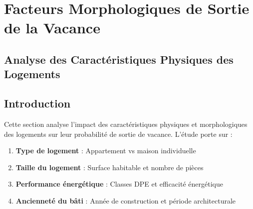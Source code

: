\documentclass[11pt]{article}
\makeatletter
\providecommand{\tightlist}{%
      \setlength{\itemsep}{0pt}\setlength{\parskip}{0pt}}
\newcommand{\boxspacing}{\kern\kvtcb@left@rule\kern\kvtcb@boxsep}
\newcommand{\prompt}[4]{
        {\ttfamily\llap{{\color{#2}[#3]:\hspace{3pt}#4}}\vspace{-\baselineskip}}
    }
\makeatother
\begin{document}
    \begin{tcolorbox}[breakable, size=fbox, boxrule=1pt, pad at break*=1mm,colback=cellbackground, colframe=cellborder]
\prompt{In}{incolor}{ }{\boxspacing}
\begin{Verbatim}[commandchars=\\\{\}]

\end{Verbatim}
\end{tcolorbox}

    \section{Facteurs Morphologiques de Sortie de la
Vacance}\label{facteurs-morphologiques-de-sortie-de-la-vacance}

\subsection{Analyse des Caractéristiques Physiques des
Logements}\label{analyse-des-caractuxe9ristiques-physiques-des-logements}

\subsection{Introduction}\label{introduction}

Cette section analyse l'impact des caractéristiques physiques et
morphologiques des logements sur leur probabilité de sortie de vacance.
L'étude porte sur :

\begin{enumerate}
\def\labelenumi{\arabic{enumi}.}
\tightlist
\item
  \textbf{Type de logement} : Appartement vs maison individuelle
\item
  \textbf{Taille du logement} : Surface habitable et nombre de pièces
\item
  \textbf{Performance énergétique} : Classes DPE et efficacité
  énergétique
\item
  \textbf{Ancienneté du bâti} : Année de construction et période
  architecturale
\end{enumerate}
\end{document}
